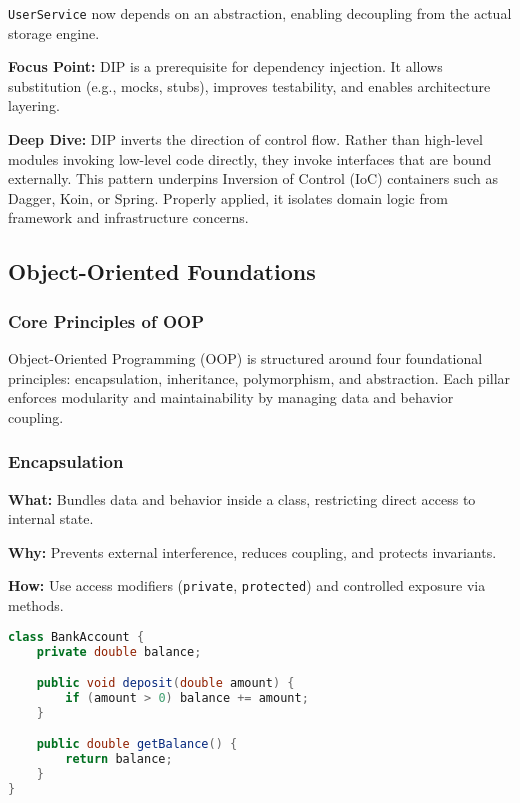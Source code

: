 \documentclass[a4paper,12pt]{article}
\begin{document}
\texttt{UserService} now depends on an abstraction, enabling decoupling from the actual storage engine.

\textbf{Focus Point:} DIP is a prerequisite for dependency injection. It allows substitution (e.g., mocks, stubs), improves testability, and enables architecture layering.

\textbf{Deep Dive:}  
DIP inverts the direction of control flow. Rather than high-level modules invoking low-level code directly, they invoke interfaces that are bound externally. This pattern underpins Inversion of Control (IoC) containers such as Dagger, Koin, or Spring. Properly applied, it isolates domain logic from framework and infrastructure concerns.


\subsection{Object-Oriented Foundations}

\subsubsection{Core Principles of OOP}

Object-Oriented Programming (OOP) is structured around four foundational principles: encapsulation, inheritance, polymorphism, and abstraction. Each pillar enforces modularity and maintainability by managing data and behavior coupling.

\subsubsection{Encapsulation}

\textbf{What:} Bundles data and behavior inside a class, restricting direct access to internal state.

\textbf{Why:} Prevents external interference, reduces coupling, and protects invariants.

\textbf{How:} Use access modifiers (\texttt{private}, \texttt{protected}) and controlled exposure via methods.

\begin{lstlisting}[language=Java]
class BankAccount {
    private double balance;

    public void deposit(double amount) {
        if (amount > 0) balance += amount;
    }

    public double getBalance() {
        return balance;
    }
}
\end{lstlisting}
\end{document}
